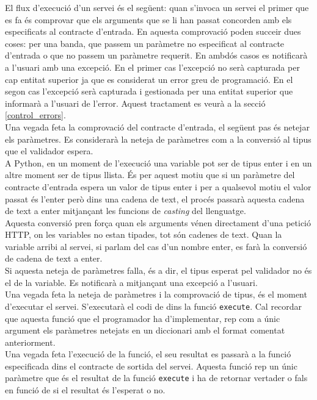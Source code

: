 	El flux d'execució d'un servei és el següent: quan s'invoca un servei el primer que es fa és comprovar que els arguments que se li han passat concorden amb els especificats al contracte d'entrada.  En aquesta comprovació poden succeir dues coses: per una banda, que passem un paràmetre no especificat al contracte d'entrada o que no passem un paràmetre requerit. En ambdós casos es notificarà a l'usuari amb una excepció. En el primer cas l'excepció no serà capturada per cap entitat superior ja que es considerat un error greu de programació. En el segon cas l'excepció serà capturada i gestionada per una entitat superior que informarà a l'usuari de l'error. Aquest tractament es veurà a la secció \ref{control_errors}.\\
	
	Una vegada feta la comprovació del contracte d'entrada, el següent pas és netejar els paràmetres. Es considerarà la neteja de paràmetres com a la conversió al tipus que el validador espera.\\
	
	A Python, en un moment de l'execució una variable pot ser de tipus enter i en un altre moment ser de tipus llista. És per aquest motiu que si un paràmetre del contracte d'entrada espera un valor de tipus enter i per a qualsevol motiu el valor passat és l'enter però dins una cadena de text, el procés passarà aquesta cadena de text a enter mitjançant les funcions de \emph{casting} del llenguatge.\\
	
	Aquesta conversió pren força quan els arguments vénen directament d'una petició \ac{HTTP}, on les variables no estan tipades, tot són cadenes de text. Quan la variable arribi al servei, si parlam del cas d'un nombre enter, es farà la conversió de cadena de text a enter. \\
	
	Si aquesta neteja de paràmetres falla, és a dir, el tipus esperat pel validador no és el de la variable. Es notificarà a mitjançant una excepció a l'usuari.\\

	Una vegada feta la neteja de paràmetres i la comprovació de tipus, és el moment d'executar el servei. S'executarà el codi de dins la funció \texttt{execute}. Cal recordar que aquesta funció que el programador ha d'implementar, rep com a únic argument els paràmetres netejats en un diccionari amb el format comentat anteriorment.\\
	
	Una vegada feta l'execució de la funció, el seu resultat es passarà a la funció especificada dins el contracte de sortida del servei. Aquesta funció rep un únic paràmetre que és el resultat de la funció \texttt{execute} i ha de retornar vertader o fals en funció de si el resultat és l'esperat o no.\\
	
